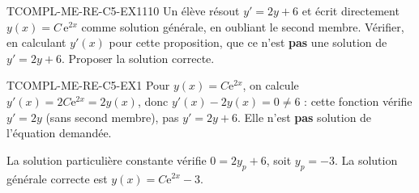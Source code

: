 

\begin{exercice}{TCOMPL-ME-RE-C5-EX1}{1}{10}
Un élève résout $y'=2y+6$ et écrit directement $y(x)=C\,\mathrm{e}^{2x}$ comme solution générale, en oubliant le second membre. Vérifier, en calculant $y'(x)$ pour cette proposition, que ce n'est \textbf{pas} une solution de $y'=2y+6$. Proposer la solution correcte.
\end{exercice}


\begin{corrige}{TCOMPL-ME-RE-C5-EX1}
Pour $y(x)=C\mathrm{e}^{2x}$, on calcule $y'(x) = 2C\mathrm{e}^{2x} = 2y(x)$, donc $y'(x) - 2y(x) = 0
\neq 6$ : cette fonction vérifie $y'=2y$ (sans second membre), pas $y'=2y+6$. Elle n'est \textbf{pas} solution de l'équation demandée.

La solution particulière constante vérifie $0=2y_p+6$, soit $y_p=-3$. La solution générale correcte est $y(x) = C\mathrm{e}^{2x} - 3$.
\end{corrige}
